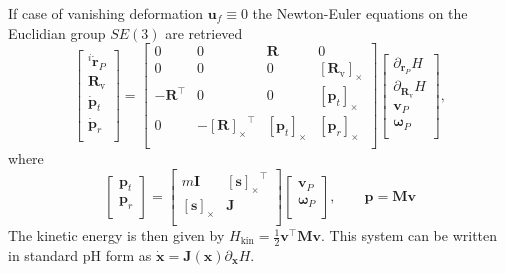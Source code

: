 \documentclass{svjour3}                     %
\newcommand{\crmat}[1]{\ensuremath{[#1]_{\times}}}
\begin{document}
\begin{remark}
If case of vanishing deformation $\bm{u}_f \equiv 0$ the Newton-Euler equations on the Euclidian group $SE(3)$ are retrieved
\begin{equation*}
\begin{bmatrix}
^i\dot{\bm{r}}_P \\ \bm{R}_{\text{v}} \\\dot{\bm{p}}_t \\ \dot{\bm{p}}_r \\
\end{bmatrix} = 
\begin{bmatrix}
0 & 0 & \bm{R} & 0 \\
0 & 0 & 0 & \crmat{\bm{R}_{\text{v}}} \\
- \bm{R}^\top & 0 & 0 & \crmat{\bm{p}_t}\\
0 & -\crmat{\bm{R}}^\top & \crmat{\bm{p}_t} & \crmat{\bm{p}_r} \\
\end{bmatrix}
\begin{bmatrix}
\partial_{\bm{r}_P} H \\ \partial_{\bm{R}_{\text{v}}} H \\ \bm{v}_P \\ \bm{\omega}_P  \\
\end{bmatrix},
\end{equation*}
where
\begin{equation*}
\begin{bmatrix}
\bm{p}_t \\ \bm{p}_r \\ 
\end{bmatrix} = 
\begin{bmatrix}
m \bm{I} & \crmat{\bm{s}}^\top \\
\crmat{\bm{s}} & \bm{J} \\
\end{bmatrix}
\begin{bmatrix}
\bm{v}_P \\ \bm{\omega}_P  \\ 
\end{bmatrix}, \qquad \bm{p} = \bm{M} \bm{v}
\end{equation*}
The kinetic energy is then given by $H_{\text{kin}} = \frac{1}{2} \bm{v}^\top \bm{M} \bm{v}$.
This system can be written in standard pH form as $\dot{\bm{x}} = \bm{J}(\bm{x})\partial_{\bm{x}} H$.
\end{remark}
\end{document}
